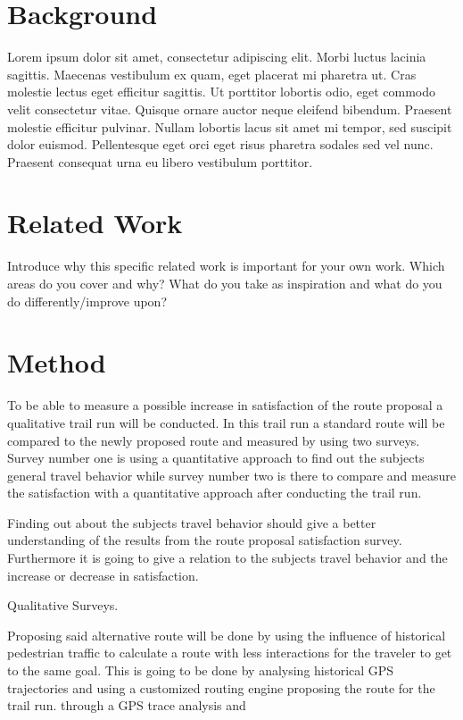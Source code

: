 \section{Background}
Lorem ipsum dolor sit amet, consectetur adipiscing elit. Morbi luctus lacinia sagittis. Maecenas vestibulum ex quam, eget placerat mi pharetra ut. Cras molestie lectus eget efficitur sagittis. Ut porttitor lobortis odio, eget commodo velit consectetur vitae. Quisque ornare auctor neque eleifend bibendum. Praesent molestie efficitur pulvinar. Nullam lobortis lacus sit amet mi tempor, sed suscipit dolor euismod. Pellentesque eget orci eget risus pharetra sodales sed vel nunc. Praesent consequat urna eu libero vestibulum porttitor.


\section{Related Work}
Introduce why this specific related work is important for your own work. Which areas do you cover and why? What do you take as inspiration and what do you do differently/improve upon? 

\autocite[]{Sevtsuk2021}
  

\section{Method}

To be able to measure a possible increase in satisfaction of the route proposal a qualitative trail run will be conducted. In this trail run a standard route will be compared to the newly proposed route and measured by using two surveys. Survey number one is using a quantitative approach to find out the subjects general travel behavior while survey number two is there to compare and measure the satisfaction with a quantitative approach after conducting the trail run.

Finding out about the subjects travel behavior should give a better understanding of the results from the route proposal satisfaction survey. Furthermore it is going to give a relation to the subjects travel behavior and the increase or decrease in satisfaction.

Qualitative Surveys.

Proposing said alternative route will be done by using the influence of historical pedestrian traffic to calculate a route with less interactions for the traveler to get to the same goal. This is going to be done by analysing historical GPS trajectories and using a customized routing engine proposing the route for the trail run.   through a GPS trace analysis and   



